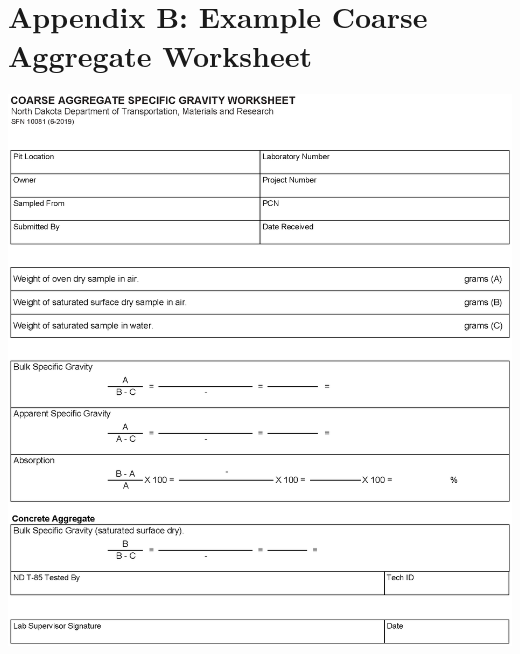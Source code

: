 \documentclass[12pt]{article}
\begin{document}
\section*{Appendix B: Example Coarse Aggregate Worksheet}
\label{AppendixA}
\begin{center}
    \includegraphics[width=1\linewidth]{NDDOT_Coare_Agg.eps}
\end{center}

\end{document}
